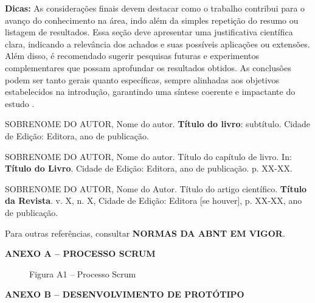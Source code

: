 \documentclass[
	article,			%
	12pt,				%
	oneside,			%
	a4paper,			%
	english,			%
	brazil,				%
	sumario=tradicional
]{abntex2}
\begin{document}
\textbf{Dicas:} As considerações finais devem destacar como o trabalho
contribui para o avanço do conhecimento na área, indo além da simples
repetição do resumo ou listagem de resultados. Essa seção deve apresentar
uma justificativa científica clara, indicando a relevância dos achados e
suas possíveis aplicações ou extensões. Além disso, é recomendado sugerir
pesquisas futuras e experimentos complementares que possam aprofundar os
resultados obtidos. As conclusões podem ser tanto gerais quanto
específicas, sempre alinhadas aos objetivos estabelecidos na introdução,
garantindo uma síntese coerente e impactante do estudo \cite{Borja2021}.

\nocite{Sommerville2011}
\vspace{\baselineskip}
\printbibliography[title={REFERÊNCIAS}]

\noindent SOBRENOME DO AUTOR, Nome do autor. \textbf{Título do livro}:
subtítulo. Cidade de Edição: Editora, ano de publicação.

\bigskip

\noindent SOBRENOME DO AUTOR, Nome do autor. Título do capítulo de livro.
In: \textbf{Título do Livro}. Cidade de Edição: Editora, ano de publicação.
p. XX-XX.

\bigskip

\noindent SOBRENOME DO AUTOR, Nome do Autor. Título do artigo científico.
\textbf{Título da Revista}. v. X, n. X, Cidade de Edição: Editora [se
houver], p. XX-XX, ano de publicação.

\bigskip

\noindent Para outras referências, consultar \textbf{NORMAS DA ABNT EM
VIGOR}.

\clearpage
\begin{center}
    \textbf{ANEXO A -- PROCESSO SCRUM}
\end{center}

\begin{figure}[h]
    \centering
    \caption*{Figura A1 -- Processo Scrum}
    \label{fig:anexoA}
\end{figure}

\clearpage
\begin{center}
    \textbf{ANEXO B -- DESENVOLVIMENTO DE PROTÓTIPO}
\end{center}
\end{document}
